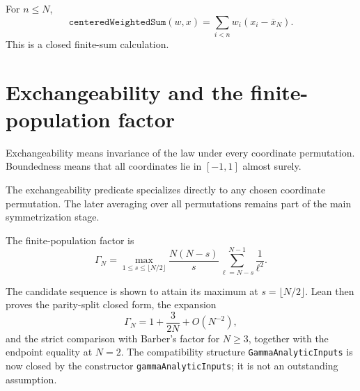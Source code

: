 \begin{theorem}
\label{thm:centered-identity}
For \(n\le N\),
\[
  \texttt{centeredWeightedSum}(w,x)
  =\sum_{i<n}w_i(x_i-\overline x_N).
\]
This is a closed finite-sum calculation.
\end{theorem}

\section{Exchangeability and the finite-population factor}

\begin{definition}
Exchangeability means invariance of the law under every coordinate
permutation.  Boundedness means that all coordinates lie in \([-1,1]\) almost
surely.
\end{definition}

\begin{lemma}
The exchangeability predicate specializes directly to any chosen coordinate
permutation.  The later averaging over all permutations remains part of the
main symmetrization stage.
\end{lemma}

\begin{definition}
\label{def:gamma}
The finite-population factor is
\[
  \Gamma_N=\max_{1\le s\le\lfloor N/2\rfloor}
  \frac{N(N-s)}s\sum_{\ell=N-s}^{N-1}\frac1{\ell^2}.
\]
\end{definition}

\begin{theorem}
\label{thm:gamma-complete}
The candidate sequence is shown to attain its maximum at
\(s=\lfloor N/2\rfloor\).  Lean then proves the parity-split closed form,
the expansion
\[
  \Gamma_N=1+\frac{3}{2N}+O(N^{-2}),
\]
and the strict comparison with Barber's factor for \(N\ge3\), together with
the endpoint equality at \(N=2\).  The compatibility structure
\texttt{GammaAnalyticInputs} is now closed by the constructor
\texttt{gammaAnalyticInputs}; it is not an outstanding assumption.
\end{theorem}

